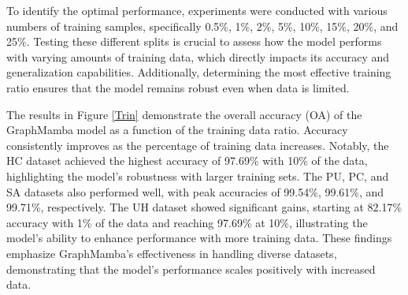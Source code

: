 \documentclass[journal]{IEEEtran}
\begin{document}
To identify the optimal performance, experiments were conducted with various numbers of training samples, specifically 0.5\%, 1\%, 2\%, 5\%, 10\%, 15\%, 20\%, and 25\%. Testing these different splits is crucial to assess how the model performs with varying amounts of training data, which directly impacts its accuracy and generalization capabilities. Additionally, determining the most effective training ratio ensures that the model remains robust even when data is limited.

The results in Figure \ref{Trin} demonstrate the overall accuracy (OA) of the GraphMamba model as a function of the training data ratio. Accuracy consistently improves as the percentage of training data increases. Notably, the HC dataset achieved the highest accuracy of 97.69\% with 10\% of the data, highlighting the model's robustness with larger training sets. The PU, PC, and SA datasets also performed well, with peak accuracies of 99.54\%, 99.61\%, and 99.71\%, respectively. The UH dataset showed significant gains, starting at 82.17\% accuracy with 1\% of the data and reaching 97.69\% at 10\%, illustrating the model's ability to enhance performance with more training data. These findings emphasize GraphMamba's effectiveness in handling diverse datasets, demonstrating that the model's performance scales positively with increased data.
\end{document}
